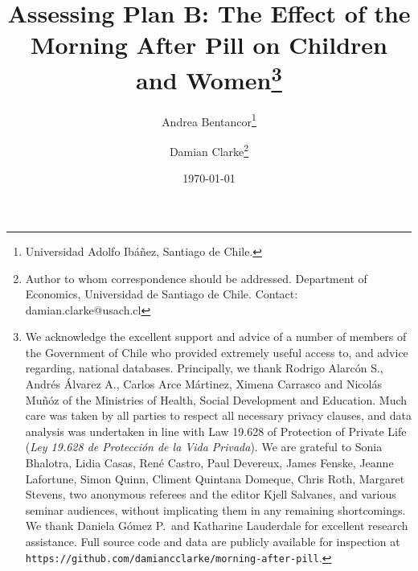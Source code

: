 \documentclass{article}[11pt,subeqn]
\title{Assessing Plan B: The Effect of the Morning After Pill on Children and 
Women\footnote{We acknowledge the excellent support and advice of a number of 
members of the Government of Chile who provided extremely useful access to, and 
advice regarding, national databases.  Principally, we thank Rodrigo Alarc\'on S., 
Andr\'es \'Alvarez A., Carlos Arce M\'artinez, Ximena Carrasco and Nicol\'as 
Mu\~n\'oz of the Ministries of Health, Social Development and Education.  Much 
care was taken by all parties to respect all necessary privacy clauses, and data 
analysis was undertaken in line with Law 19.628 of Protection of Private Life 
(\emph{Ley 19.628 de Protecci\'on de la Vida Privada}).  We are grateful to Sonia 
Bhalotra, Lidia Casas, Ren\'e Castro, Paul Devereux, James Fenske, Jeanne 
Lafortune, Simon Quinn, Climent Quintana Domeque, Chris Roth, Margaret Stevens,
two anonymous referees and the editor Kjell Salvanes, and various seminar
audiences, without implicating them in any remaining shortcomings. We thank
Daniela G\'omez P.\ and Katharine Lauderdale for excellent research assistance.
Full source code and data are publicly available for inspection at 
\texttt{https://github.com/damiancclarke/morning-after-pill}.}}
\author{Andrea Bentancor\thanks{Universidad Adolfo Ib\'a\~nez, Santiago de Chile.} 
  \and Damian Clarke\thanks{Author to whom correspondence should be addressed. Department of
    Economics, Universidad de Santiago de Chile.  
Contact: damian.clarke@usach.cl}}
\date{\today}
\begin{document}
\begin{spacing}{1.4}
\maketitle



\end{spacing}
\end{document}
